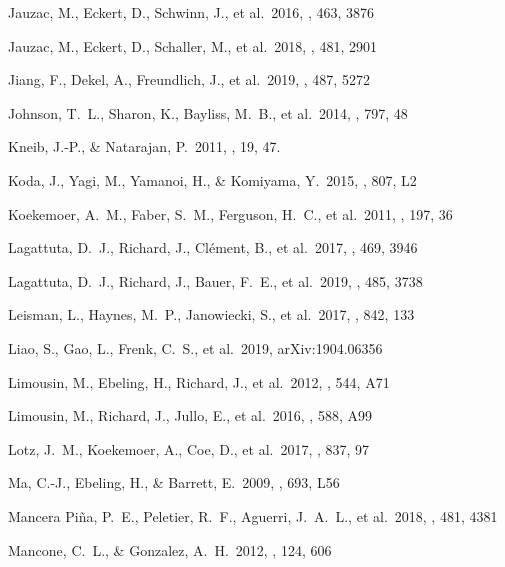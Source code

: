\documentclass[iop,tighten,twocolumn,apj,floatfix]{emulateapj}
\begin{document}
\begin{thebibliography}{}
 Jauzac, M., Eckert, D., Schwinn, J., et al.\ 2016, \mnras, 463, 3876

 Jauzac, M., Eckert, D., Schaller, M., et al.\ 2018, \mnras, 481, 2901

 Jiang, F., Dekel, A., Freundlich, J., et al.\ 2019, \mnras, 487, 5272

 Johnson, T.~L., Sharon, K., Bayliss, M.~B., et al.\ 2014, \apj, 797, 48

 Kneib, J.-P., \& Natarajan, P.\ 2011, \aapr, 19, 47.

 Koda, J., Yagi, M., Yamanoi,
H., \& Komiyama, Y.\ 2015, \apjl, 807, L2

 Koekemoer, A.~M., Faber,
S.~M., Ferguson, H.~C., et al.\ 2011, \apjs, 197, 36

 Lagattuta, D.~J.,
Richard, J., Cl{\'e}ment, B., et al.\ 2017, \mnras, 469, 3946

 Lagattuta, D.~J., Richard, J., Bauer, F.~E., et al.\ 2019, \mnras, 485, 3738

 Leisman, L., Haynes, M.~P., Janowiecki, S., et al.\ 2017, \apj, 842, 133

 Liao, S., Gao, L., Frenk, C.~S., et al.\ 2019, arXiv:1904.06356

 Limousin, M., Ebeling, H., Richard, J., et al.\ 2012, \aap, 544, A71

 Limousin, M., Richard, J., Jullo, E., et al.\ 2016, \aap, 588, A99

 Lotz, J.~M., Koekemoer, A., Coe, D., et al.\ 2017, \apj, 837, 97

 Ma, C.-J., Ebeling, H., \& Barrett, E.\ 2009, \apj, 693, L56

 Mancera Pi{\~n}a,
    P.~E., Peletier, R.~F., Aguerri, J.~A.~L., et al.\ 2018, \mnras, 481, 4381

 Mancone, C.~L., \& Gonzalez, A.~H.\ 2012, \pasp, 124, 606


\end{thebibliography}
\end{document}
